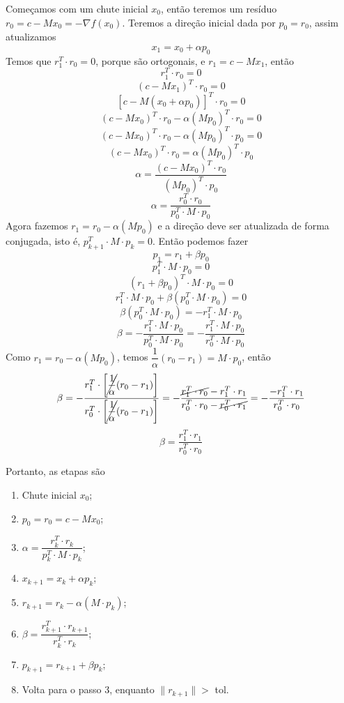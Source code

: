 \documentclass{article}
\begin{document}
    Começamos com um chute inicial $x_0$, então teremos um resíduo $r_0 = c - Mx_0 = -\nabla f(x_0)$. Teremos a direção inicial dada por $p_0 = r_0$, assim atualizamos
    \[x_1 = x_0 + \alpha p_0\]
    Temos que $r_1^T \cdot r_0 = 0$, porque são ortogonais, e $r_1 = c-Mx_1$, então
    \[r_1^T \cdot r_0 = 0\]
    \[(c-Mx_1)^T \cdot r_0 = 0\]
    \[[c-M(x_0 + \alpha p_0)]^T \cdot r_0 = 0\]
    \[(c-Mx_0)^T \cdot r_0 - \alpha(Mp_0)^T \cdot r_0 = 0\]
    \[(c-Mx_0)^T \cdot r_0 - \alpha(Mp_0)^T \cdot p_0 = 0\]
    \[(c-Mx_0)^T \cdot r_0 = \alpha(Mp_0)^T \cdot p_0\]
    \[\alpha = \frac{(c-Mx_0)^T \cdot r_0}{(Mp_0)^T \cdot p_0}\]
    \[\alpha = \frac{r_0^T \cdot r_0}{p_0^T \cdot M \cdot p_0}\]
    Agora fazemos $r_1 = r_0 - \alpha(Mp_0)$ e a direção deve ser atualizada de forma conjugada, isto é, $p_{k+1}^T \cdot M \cdot p_k = 0$. Então podemos fazer
    \[p_1 = r_1 + \beta p_0\]
    \[p_{1}^T \cdot M \cdot p_0 = 0\]
    \[(r_1 + \beta p_0)^T \cdot M \cdot p_0 = 0\]
    \[r_1^T \cdot M \cdot p_0 + \beta (p_0^T \cdot M \cdot p_0) = 0\]
    \[\beta (p_0^T \cdot M \cdot p_0) = -r_1^T \cdot M \cdot p_0\]
    \[\beta = -\frac{r_1^T \cdot M \cdot p_0}{p_0^T \cdot M \cdot p_0} = -\frac{r_1^T \cdot M \cdot p_0}{r_0^T \cdot M \cdot p_0}\]
    Como $r_1 = r_0 - \alpha(Mp_0)$, temos $\dfrac{1}{\alpha}(r_0 - r_1) = M \cdot p_0$, então
    \[\beta = -\frac{r_1^T \cdot \left[\cancel{\dfrac{1}{\alpha}}(r_0 - r_1)\right]}{r_0^T \cdot \left[\cancel{\dfrac{1}{\alpha}}(r_0 - r_1)\right]} = - \frac{\cancel{r_1^T \cdot r_0} - r_1^T \cdot r_1}{r_0^T \cdot r_0 - \cancel{r_0^T \cdot r_1}} = - \frac{- r_1^T \cdot r_1}{r_0^T \cdot r_0}\]
    \[\beta = \frac{r_1^T \cdot r_1}{r_0^T \cdot r_0}\]

    \newpage

    Portanto, as etapas são
    {\hspace{2cm}
    \begin{enumerate}[leftmargin=2cm]
        \item Chute inicial $x_0$;
        \item $p_0 = r_0 = c - Mx_0$;
        \item $\alpha = \dfrac{r_k^T \cdot r_k}{p_k^T \cdot M \cdot p_k}$;
        \item $x_{k+1} = x_k + \alpha p_k$;
        \item $r_{k+1} = r_k - \alpha (M \cdot p_k)$;
        \item $\beta = \dfrac{r_{k+1}^T \cdot r_{k+1}}{r_k^T \cdot r_k}$;
        \item $p_{k+1} = r_{k+1} + \beta p_k$;
        \item Volta para o passo 3, enquanto $\|r_{k+1}\| > $ tol.
    \end{enumerate}
    }
    
\end{document}

